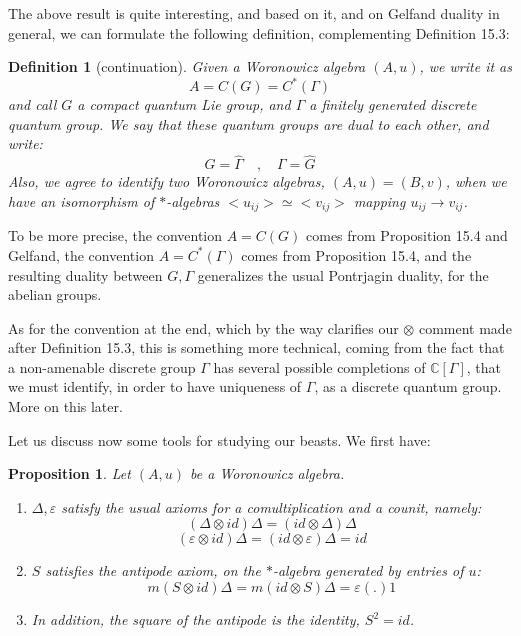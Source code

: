 \documentclass[12pt]{amsbook}
\newtheorem{definition}[theorem]{Definition}
\newtheorem{proposition}[theorem]{Proposition}
\begin{document}
The above result is quite interesting, and based on it, and on Gelfand duality in general, we can formulate the following definition, complementing Definition 15.3:

\begin{definition}[continuation]
Given a Woronowicz algebra $(A,u)$, we write it as
$$A=C(G)=C^*(\Gamma)$$
and call $G$ a compact quantum Lie group, and $\Gamma$ a finitely generated discrete quantum group. We say that these quantum groups are dual to each other, and write: 
$$G=\widehat{\Gamma}\quad,\quad\Gamma=\widehat{G}$$
Also, we agree to identify two Woronowicz algebras, $(A,u)=(B,v)$, when we have an isomorphism of $*$-algebras $<u_{ij}>\simeq<v_{ij}>$ mapping $u_{ij}\to v_{ij}$.
\end{definition}

To be more precise, the convention $A=C(G)$ comes from Proposition 15.4 and Gelfand, the convention $A=C^*(\Gamma)$ comes from Proposition 15.4, and the resulting duality between $G,\Gamma$ generalizes the usual Pontrjagin duality, for the abelian groups. 

\bigskip

As for the convention at the end, which by the way clarifies our $\otimes$ comment made after Definition 15.3, this is something more technical, coming from the fact that a non-amenable discrete group $\Gamma$ has several possible completions of $\mathbb C[\Gamma]$, that we must identify, in order to have uniqueness of $\Gamma$, as a discrete quantum group. More on this later.

\bigskip

Let us discuss now some tools for studying our beasts. We first have:

\begin{proposition}
Let $(A,u)$ be a Woronowicz algebra.
\begin{enumerate} 
\item $\Delta,\varepsilon$ satisfy the usual axioms for a comultiplication and a counit, namely:
$$(\Delta\otimes id)\Delta=(id\otimes \Delta)\Delta$$
$$(\varepsilon\otimes id)\Delta=(id\otimes\varepsilon)\Delta=id$$

\item $S$ satisfies the antipode axiom, on the $*$-algebra generated by entries of $u$: 
$$m(S\otimes id)\Delta=m(id\otimes S)\Delta=\varepsilon(.)1$$

\item In addition, the square of the antipode is the identity, $S^2=id$.
\end{enumerate}
\end{proposition}
\end{document}
